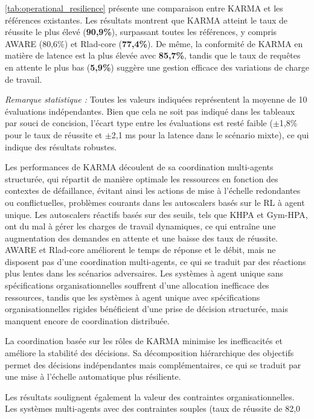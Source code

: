 %
\autoref{tab:operational_resilience} présente une comparaison entre KARMA et les références existantes. Les résultats montrent que KARMA atteint le taux de réussite le plus élevé (\textbf{90,9\%}), surpassant toutes les références, y compris AWARE (80,6\%) et Rlad-core (\textbf{77,4\%}). De même, la conformité de KARMA en matière de latence est la plus élevée avec \textbf{85,7\%}, tandis que le taux de requêtes en attente le plus bas (\textbf{5,9\%}) suggère une gestion efficace des variations de charge de travail.

\noindent \textit{Remarque statistique :} Toutes les valeurs indiquées représentent la moyenne de 10 évaluations indépendantes. Bien que cela ne soit pas indiqué dans les tableaux par souci de concision, l'écart type entre les évaluations est resté faible ($\pm$1,8\% pour le taux de réussite et $\pm$2,1 ms pour la latence dans le scénario mixte), ce qui indique des résultats robustes.

Les performances de KARMA découlent de sa coordination multi-agents structurée, qui répartit de manière optimale les ressources en fonction des contextes de défaillance, évitant ainsi les actions de mise à l'échelle redondantes ou conflictuelles, problèmes courants dans les autoscalers basés sur le RL à agent unique.
%
Les autoscalers réactifs basés sur des seuils, tels que KHPA et Gym-HPA, ont du mal à gérer les charges de travail dynamiques, ce qui entraîne une augmentation des demandes en attente et une baisse des taux de réussite. AWARE et Rlad-core améliorent le temps de réponse et le débit, mais ne disposent pas d'une coordination multi-agents, ce qui se traduit par des réactions plus lentes dans les scénarios adversaires. Les systèmes à agent unique sans spécifications organisationnelles souffrent d'une allocation inefficace des ressources, tandis que les systèmes à agent unique avec spécifications organisationnelles rigides bénéficient d'une prise de décision structurée, mais manquent encore de coordination distribuée.

La coordination basée sur les rôles de KARMA minimise les inefficacités et améliore la stabilité des décisions. Sa décomposition hiérarchique des objectifs permet des décisions indépendantes mais complémentaires, ce qui se traduit par une mise à l'échelle automatique plus résiliente.

Les résultats soulignent également la valeur des contraintes organisationnelles. Les systèmes multi-agents avec des contraintes souples (taux de réussite de 82,0 %



